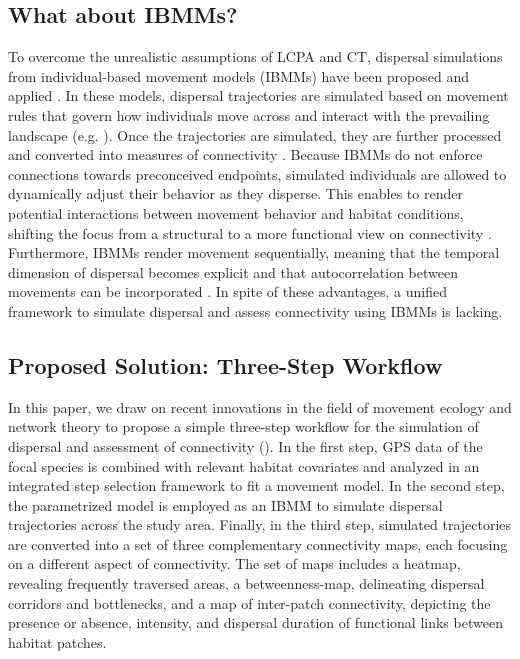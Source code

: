 \documentclass[abstract=on,10pt,a4paper,bibliography=totocnumbered]{article}
\begin{document}
\subsection{What about IBMMs?}
To overcome the unrealistic assumptions of LCPA and CT, dispersal simulations
from individual-based movement models (IBMMs) have been proposed and applied
\citep{Diniz.2019}. In these models, dispersal trajectories are simulated based
on movement rules that govern how individuals move across and interact with the
prevailing landscape (e.g. \citealp{Gustafson.1996, Gardner.2004, Graf.2007,
KramerSchadt.2004, Revilla.2004, Revilla.2008, Kanagaraj.2013, Clark.2015,
Allen.2016, Hauenstein.2019, Zeller.2020, Vasudev.2021}). Once the trajectories
are simulated, they are further processed and converted into measures of
connectivity \citep{Kanagaraj.2013, Zeller.2020}. Because IBMMs do not enforce
connections towards preconceived endpoints, simulated individuals are allowed to
dynamically adjust their behavior as they disperse. This enables to render
potential interactions between movement behavior and habitat conditions,
shifting the focus from a structural to a more functional view on connectivity
\citep{Tischendorf.2000, Kanagaraj.2013, Hauenstein.2019}. Furthermore, IBMMs
render movement sequentially, meaning that the temporal dimension of dispersal
becomes explicit and that autocorrelation between movements can be incorporated
\citep{Diniz.2019}. In spite of these advantages, a unified framework to
simulate dispersal and assess connectivity using IBMMs is lacking.

\subsection{Proposed Solution: Three-Step Workflow}
In this paper, we draw on recent innovations in the field of movement ecology
and network theory to propose a simple three-step workflow for the simulation of
dispersal and assessment of connectivity (). In the
first step, GPS data of the focal species is combined with relevant habitat
covariates and analyzed in an integrated step selection framework to fit a
movement model. In the second step, the parametrized model is employed as an
IBMM to simulate dispersal trajectories across the study area. Finally, in the
third step, simulated trajectories are converted into a set of three
complementary connectivity maps, each focusing on a different aspect of
connectivity. The set of maps includes a heatmap, revealing frequently traversed
areas, a betweenness-map, delineating dispersal corridors and bottlenecks, and a
map of inter-patch connectivity, depicting the presence or absence, intensity,
and dispersal duration of functional links between habitat patches.
\end{document}
